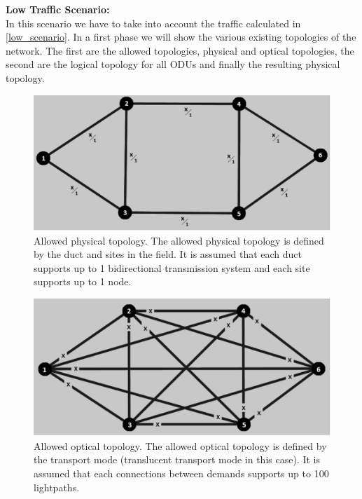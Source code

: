 \noindent
\textbf{Low Traffic Scenario:}\\

In this scenario we have to take into account the traffic calculated in \ref{low_scenario}. In a first phase we will show the various existing topologies of the network. The first are the allowed topologies, physical and optical topologies, the second are the logical topology for all ODUs and finally the resulting physical topology.\\

\begin{figure}[H]
\centering
\includegraphics[width=13cm]{sdf/heuristic/translucent_survivability/figures/allowed_physical}
\caption{Allowed physical topology. The allowed physical topology is defined by the duct and sites in the field. It is assumed that each duct supports up to 1 bidirectional transmission system and each site supports up to 1 node.}
\label{allowed_physical_surv_ref_low_heuristic_translucent}
\end{figure}

\begin{figure}[H]
\centering
\includegraphics[width=13cm]{sdf/heuristic/translucent_survivability/figures/allowed_optical}
\caption{Allowed optical topology. The allowed optical topology is defined by the transport mode (translucent transport mode in this case). It is assumed that each connections between demands supports up to 100 lightpaths.}
\label{allowed_optical_surv_ref_low_heuristic_translucent}
\end{figure}

